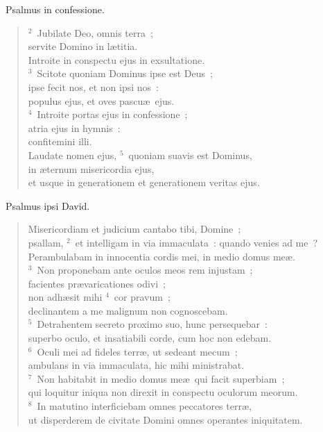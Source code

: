 ~\lettrine[lines=10,image=true,loversize=0.05,lraise=-0.03]{P}{}salmus in confessione.
\begin{flushleft}\begin{verse}\vspace{6pt}${}^{2}$~Jubilate Deo, omnis terra~;\\ servite Domino in l\ae titia.\\ Introite in conspectu ejus in exsultatione.\\
${}^{3}$~Scitote quoniam Dominus ipse est Deus~;\\ ipse fecit nos, et non ipsi nos~:\\ populus ejus, et oves pascu\ae\ ejus.\\
${}^{4}$~Introite portas ejus in confessione~;\\ atria ejus in hymnis~:\\ confitemini illi.\\ Laudate nomen ejus,
${}^{5}$~quoniam suavis est Dominus,\\ in \ae ternum misericordia ejus,\\ et usque in generationem et generationem veritas ejus.\end{verse}\end{flushleft}


~\lettrine[lines=10,image=true,loversize=0.05,lraise=-0.03]{P}{}salmus ipsi David. \begin{flushleft}\begin{verse}\vspace{6pt}Misericordiam et judicium cantabo tibi, Domine~;\\ psallam,
${}^{2}$~et intelligam in via immaculata~: quando venies ad me~?\\ Perambulabam in innocentia cordis mei, in medio domus me\ae .\\
${}^{3}$~Non proponebam ante oculos meos rem injustam~;\\ facientes pr\ae varicationes odivi~;\\ non adh\ae sit mihi
${}^{4}$~cor pravum~;\\ declinantem a me malignum non cognoscebam.\\
${}^{5}$~Detrahentem secreto proximo suo, hunc persequebar~:\\ superbo oculo, et insatiabili corde, cum hoc non edebam.\\
${}^{6}$~Oculi mei ad fideles terr\ae , ut sedeant mecum~;\\ ambulans in via immaculata, hic mihi ministrabat.\\
${}^{7}$~Non habitabit in medio domus me\ae\ qui facit superbiam~;\\ qui loquitur iniqua non direxit in conspectu oculorum meorum.\\
${}^{8}$~In matutino interficiebam omnes peccatores terr\ae ,\\ ut disperderem de civitate Domini omnes operantes iniquitatem.\end{verse}\end{flushleft}


